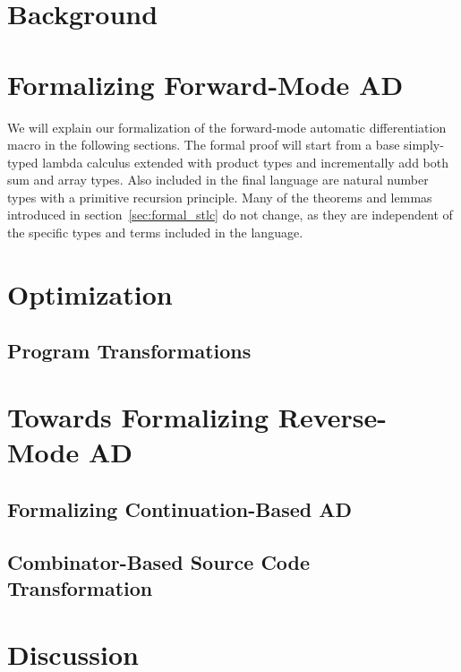 \documentclass[11pt, final]{article}
\begin{document}

\newpage


\newpage

\setcounter{page}{3}
\tableofcontents
\newpage



\section{Background}








\section{Formalizing Forward-Mode AD}
  We will explain our formalization of the forward-mode automatic differentiation macro in the following sections.
  The formal proof will start from a base simply-typed lambda calculus extended with product types and incrementally add both sum and array types.
  Also included in the final language are natural number types with a primitive recursion principle.
  Many of the theorems and lemmas introduced in section~\ref{sec:formal_stlc} do not change, as they are independent of the specific types and terms included in the language.
  
  
  
\section{Optimization}
  \subsection{Program Transformations}
\section{Towards Formalizing Reverse-Mode AD}
  \subsection{Formalizing Continuation-Based AD}
  \subsection{Combinator-Based Source Code Transformation}
\section{Discussion}
\end{document}
